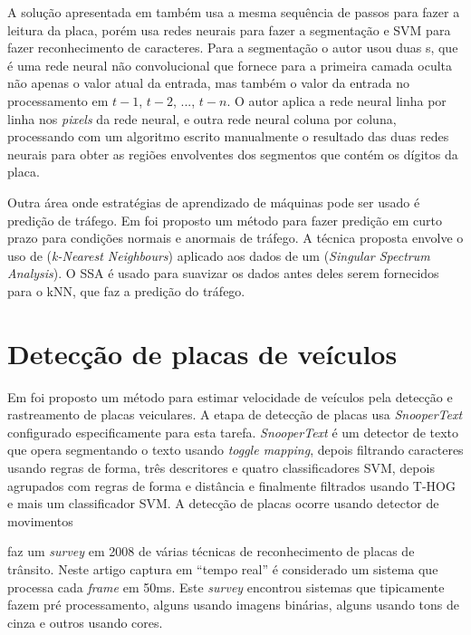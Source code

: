 A solução apresentada em
 também usa a mesma sequência de
passos para fazer a leitura da placa, porém usa redes neurais para 
fazer a segmentação e SVM para fazer reconhecimento de caracteres. Para a
segmentação o autor usou duas
s, que é uma rede neural não convolucional que
fornece para a primeira camada oculta não apenas o valor atual da entrada, mas
também o valor da entrada no processamento em $t-1$, $t-2$, ..., $t-n$. O autor
aplica a rede neural linha por linha nos \emph{pixels} da rede neural, e outra
rede neural coluna por coluna, processando com um algoritmo escrito manualmente
o resultado das duas redes neurais para obter as regiões envolventes dos
segmentos que contém os dígitos da placa.

Outra área onde estratégias de aprendizado de máquinas pode ser usado é
predição de tráfego. Em  foi proposto um método para
fazer
predição em curto prazo para condições normais e anormais de tráfego. A técnica
proposta envolve o uso de  (\emph{k-Nearest Neighbours}) aplicado aos dados de um
(\emph{Singular Spectrum Analysis}). O SSA é usado para suavizar os dados antes
deles serem fornecidos para o kNN, que faz a predição do tráfego.

\section{Detecção de placas de veículos}

Em  foi proposto um método para estimar velocidade de
veículos pela detecção e rastreamento de placas veiculares. A etapa de detecção
de placas usa \emph{SnooperText} \cite{minetto.10.icip} configurado
especificamente para esta tarefa. \emph{SnooperText} é um detector de texto
que opera segmentando o texto usando \emph{toggle mapping}, depois filtrando
caracteres usando regras de forma, três descritores e quatro classificadores
SVM, depois agrupados com regras de forma e distância e finalmente
filtrados usando T-HOG e mais um classificador SVM. A detecção de placas ocorre
usando detector de movimentos

 faz um \emph{survey} em 2008 de
várias técnicas de reconhecimento de placas de trânsito. Neste artigo
captura em ``tempo real'' é considerado um sistema que processa cada
\emph{frame} em 50ms. Este \emph{survey} encontrou sistemas 
que tipicamente fazem pré processamento, alguns usando imagens binárias,
alguns usando tons de cinza e outros usando cores.


